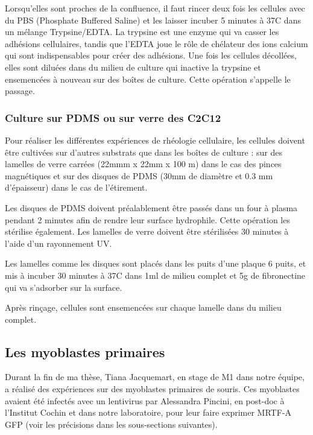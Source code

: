 	
	Lorsqu'elles sont proches de la confluence, il faut rincer deux fois les cellules avec du PBS (Phosphate Buffered Saline) et les laisser incuber 5 minutes à 37\degres   C dans un mélange Trypsine/EDTA. La trypsine est une enzyme qui va casser les adhésions cellulaires, tandis que l'EDTA joue le rôle de chélateur des ions calcium qui sont indispensables pour créer des adhésions. Une fois les cellules décollées, elles sont diluées dans du milieu de culture qui inactive la trypsine et ensemencées à nouveau sur des boîtes de culture. Cette opération s'appelle le passage. 
	 
	\subsubsection{Culture sur PDMS ou sur verre des C2C12 \label{Coating}}

	Pour réaliser les différentes expériences de rhéologie cellulaire, les cellules doivent être cultivées sur d'autres substrats que dans les boîtes de culture : sur des lamelles de verre carrées (22mmm x 22mm x 100 \micro m) dans le cas des pinces magnétiques et sur des disques de PDMS (30mm de diamètre et 0.3 mm d'épaisseur) dans le cas de l'étirement. 
	
	Les disques de PDMS doivent préalablement être passés dans un four à plasma pendant 2 minutes afin de rendre leur surface hydrophile. Cette opération les stérilise également. Les lamelles de verre doivent être stérilisées 30 minutes à l'aide d'un rayonnement UV. 
	
	Les lamelles comme les disques sont placés dans les puits d'une plaque 6 puits, et mis à incuber 30 minutes à 37\degres   C dans 1ml de milieu complet et 5\micro g de fibronectine qui va s'adsorber sur la surface. 
	
	Après rinçage,  cellules sont ensemencées sur chaque lamelle dans du milieu complet. 
	
	\subsection{Les myoblastes primaires}
	
	Durant la fin de ma thèse, Tiana Jacquemart, en stage de M1 dans notre équipe, a réalisé des expériences sur des myoblastes primaires de souris. Ces myoblastes avaient été infectés avec un lentivirus par Alessandra Pincini, en post-doc à l'Institut Cochin et dans notre laboratoire, pour leur faire exprimer MRTF-A GFP (voir les précisions dans les sous-sections suivantes). 
	

